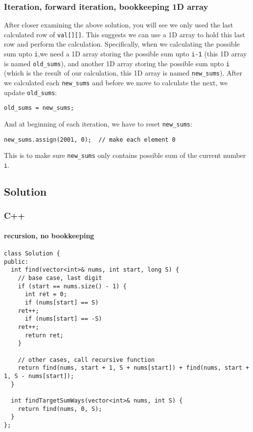 \documentclass[11pt]{article}
\begin{document}
\subsubsection{Iteration, forward iteration, bookkeeping 1D array}
\label{sec:org5bab985}
After closer examining the above solution, you will see we only used the last calculated row of \texttt{val[][]}. This suggests we can use a 1D array to hold this last row and perform the calculation. Specifically, when we calculating the possible sum upto \texttt{i},we need a 1D array storing the possible sum upto \texttt{i-1} (this 1D array is named \texttt{old\_sums}), and another 1D array storing the possible sum upto \texttt{i} (which is the result of our calculation, this 1D array is named \texttt{new\_sums}). After we calculated each \texttt{new\_sums} and before we move to calculate the next, we update \texttt{old\_sums}:
\begin{verbatim}
old_sums = new_sums;
\end{verbatim}
And at beginning of each iteration, we have to reset \texttt{new\_sums}:
\begin{verbatim}
new_sums.assign(2001, 0);  // make each element 0
\end{verbatim}
This is to make sure \texttt{new\_sums} only contains possible sum of the current number \texttt{i}.


\subsection{Solution}
\label{sec:org7169129}
\subsubsection{C++}
\label{sec:org57635cc}
\paragraph{recursion, no bookkeeping}
\label{sec:org1fc2362}
\begin{verbatim}
class Solution {
public:
  int find(vector<int>& nums, int start, long S) {
    // base case, last digit 
    if (start == nums.size() - 1) {
      int ret = 0;
      if (nums[start] == S)
	ret++;
      if (nums[start] == -S)
	ret++;
      return ret;
    }

    // other cases, call recursive function
    return find(nums, start + 1, S + nums[start]) + find(nums, start + 1, S - nums[start]);
  }

  int findTargetSumWays(vector<int>& nums, int S) {
    return find(nums, 0, S);
  }
};
\end{verbatim}
\end{document}
